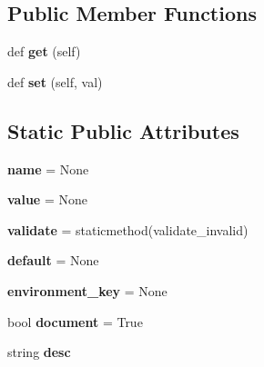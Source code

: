 \subsection*{Public Member Functions}
\begin{DoxyCompactItemize}
\item 
\mbox{\label{classgevent_1_1__config_1_1_setting_a61f4a0f63e01be5c2749de447f2ceeb8}} 
def {\bfseries get} (self)
\item 
\mbox{\label{classgevent_1_1__config_1_1_setting_a169093ee750ceb4098be02ab3a56d986}} 
def {\bfseries set} (self, val)
\end{DoxyCompactItemize}
\subsection*{Static Public Attributes}
\begin{DoxyCompactItemize}
\item 
\mbox{\label{classgevent_1_1__config_1_1_setting_a50f213a155bde2c1aa3a3a2216ee450f}} 
{\bfseries name} = None
\item 
\mbox{\label{classgevent_1_1__config_1_1_setting_a78cfdd6d867840336f517988af49507e}} 
{\bfseries value} = None
\item 
\mbox{\label{classgevent_1_1__config_1_1_setting_a7fcbe92495b6ebbf93d0eea2ffc4beaa}} 
{\bfseries validate} = staticmethod(validate\+\_\+invalid)
\item 
\mbox{\label{classgevent_1_1__config_1_1_setting_ad035f5e514b8eaf9859f40dea88aaa66}} 
{\bfseries default} = None
\item 
\mbox{\label{classgevent_1_1__config_1_1_setting_a57b94ea020e467a7ff700b0f51d3bcd7}} 
{\bfseries environment\+\_\+key} = None
\item 
\mbox{\label{classgevent_1_1__config_1_1_setting_a6b322d53864eb3c425156be73601bd1d}} 
bool {\bfseries document} = True
\item 
string {\bfseries desc}
\end{DoxyCompactItemize}


